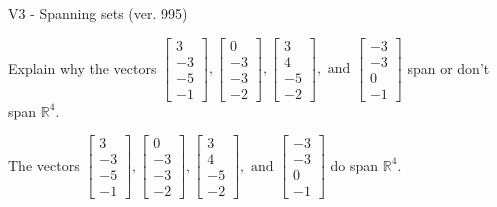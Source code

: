 \begin{exercise}
  \begin{exerciseTitle}V3 - Spanning sets (ver. 995)\end{exerciseTitle}
  \begin{exerciseStatement}
    Explain why the vectors \(\left[\begin{array}{r}
3 \\
-3 \\
-5 \\
-1
\end{array}\right] , \left[\begin{array}{r}
0 \\
-3 \\
-3 \\
-2
\end{array}\right] , \left[\begin{array}{r}
3 \\
4 \\
-5 \\
-2
\end{array}\right] , \text{ and } \left[\begin{array}{r}
-3 \\
-3 \\
0 \\
-1
\end{array}\right]\) span or don't span \(\mathbb{R}^4\). 
	


  \end{exerciseStatement}
  \begin{exerciseAnswer}
   The vectors \(\left[\begin{array}{r}
3 \\
-3 \\
-5 \\
-1
\end{array}\right] , \left[\begin{array}{r}
0 \\
-3 \\
-3 \\
-2
\end{array}\right] , \left[\begin{array}{r}
3 \\
4 \\
-5 \\
-2
\end{array}\right] , \text{ and } \left[\begin{array}{r}
-3 \\
-3 \\
0 \\
-1
\end{array}\right]\) 
  	 do  
	span \(\mathbb{R}^4\).
  


  \end{exerciseAnswer}
\end{exercise}